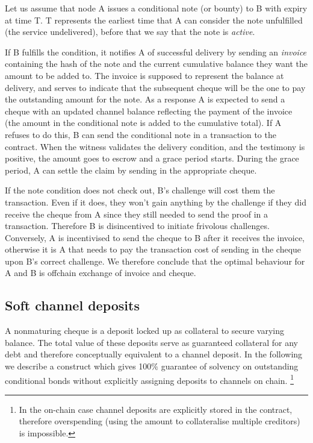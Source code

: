 \documentclass[a4paper,10pt]{article}
\newcommand\gloss[1]{\emph{\gls{#1}}}
\begin{document}
Let us assume that node A issues a conditional note (or bounty) to B with expiry at time T.
T represents the earliest time that A can consider the note unfulfilled (the service undelivered), before
that we say that the note is \emph{active}.

If B fulfills the condition, it notifies A of successful delivery
by sending an \gloss{invoice} containing the hash of the note and the current cumulative balance they want the
amount to be added to. The invoice is supposed to represent the balance at delivery, and serves to
indicate that the subsequent cheque will be the one to pay the outstanding amount for the note.
As a response A is expected to send a cheque with an updated channel balance reflecting the
payment of the invoice (the amount in the conditional note is added to the cumulative total).
If A refuses to do this, B can send the conditional note in a transaction
to  the contract. When the witness validates the delivery condition, and the testimony is
positive, the amount goes to escrow and a grace period starts.
During the grace period, A can settle the claim by sending in the appropriate cheque.

If the note condition does not check out, B's challenge will cost them the transaction.
Even if it does, they won't gain anything by the challenge if they did receive the
cheque from A since they still needed to send the proof in a transaction.
Therefore B is disincentived to initiate frivolous challenges.
Conversely, A is incentivised to send the cheque to B after it receives the invoice,
otherwise it is A that needs to pay the transaction cost of sending in the cheque upon B's correct challenge.
We therefore conclude that the optimal behaviour for A and B is offchain exchange of invoice and cheque.

\subsection{Soft channel deposits}
A nonmaturing cheque is a deposit locked up as collateral to secure varying balance.
The total value of these deposits serve as guaranteed collateral for any debt and
therefore conceptually equivalent to a channel deposit.
In the following we describe a construct which gives 100$\%$ guarantee of solvency
on outstanding conditional bonds without explicitly assigning deposits to channels on chain.%
%
\footnote{In the on-chain case channel deposits are explicitly stored in the contract, therefore overspending
(using the amount to collateralise multiple creditors) is impossible.}
\end{document}
